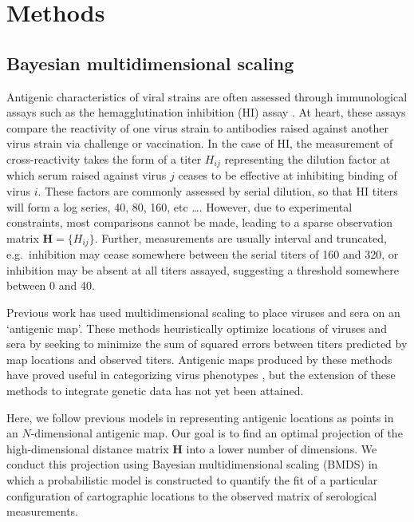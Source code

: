 \documentclass[11pt,oneside,letterpaper]{article}
\begin{document}
\section*{Methods}

\subsection*{Bayesian multidimensional scaling}

Antigenic characteristics of viral strains are often assessed through immunological assays such as the hemagglutination inhibition (HI) assay \cite{Hirst43}.  
At heart, these assays compare the reactivity of one virus strain to antibodies raised against another virus strain via challenge or vaccination.  
In the case of HI, the measurement of cross-reactivity takes the form of a titer $H_{ij}$ representing the dilution factor at which serum raised against virus $j$ ceases to be effective at inhibiting binding of virus $i$.  
These factors are commonly assessed by serial dilution, so that HI titers will form a log series, 40, 80, 160, etc \dots.
However, due to experimental constraints, most comparisons cannot be made, leading to a sparse observation matrix $\mathbf{H} = \{H_{ij}\}$.  
Further, measurements are usually interval and truncated, e.g.\ inhibition may cease somewhere between the serial titers of 160 and 320, or inhibition may be absent at all titers assayed, suggesting a threshold somewhere between 0 and 40.  

Previous work \cite{Smith04, Cai10} has used multidimensional scaling to place viruses and sera on an `antigenic map'.  
These methods heuristically optimize locations of viruses and sera by seeking to minimize the sum of squared errors between titers predicted by map locations and observed titers.  
Antigenic maps produced by these methods have proved useful in categorizing virus phenotypes \cite{Smith04}, but the extension of these methods to integrate genetic data has not yet been attained.

Here, we follow previous models in representing antigenic locations as points in an $N$-dimensional antigenic map. 
Our goal is to find an optimal projection of the high-dimensional distance matrix $\mathbf{H}$ into a lower number of dimensions. 
We conduct this projection using Bayesian multidimensional scaling (BMDS) \cite{Oh01} in which a probabilistic model is constructed to quantify the fit of a particular configuration of cartographic locations to the observed matrix of serological measurements.
\end{document}
